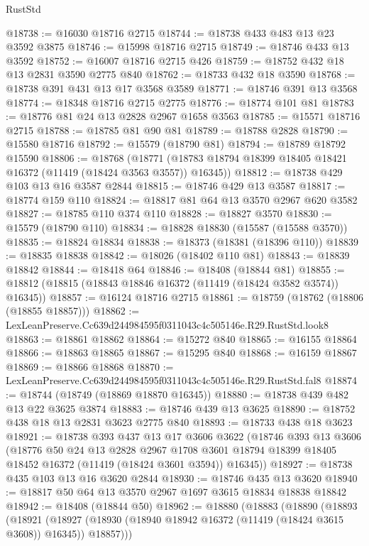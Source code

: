 \begin{lexlean}{RustStd}
\begin{coremodule}
@18738 := @16030 @18716 @2715
@18744 := @18738 @433 @483 @13 @23 @3592 @3875
@18746 := @15998 @18716 @2715
@18749 := @18746 @433 @13 @3592
@18752 := @16007 @18716 @2715 @426
@18759 := @18752 @432 @18 @13 @2831 @3590 @2775 @840
@18762 := @18733 @432 @18 @3590
@18768 := @18738 @391 @431 @13 @17 @3568 @3589
@18771 := @18746 @391 @13 @3568
@18774 := @18348 @18716 @2715 @2775
@18776 := @18774 @101 @81
@18783 := @18776 @81 @24 @13 @2828 @2967 @1658 @3563
@18785 := @15571 @18716 @2715
@18788 := @18785 @81 @90 @81
@18789 := @18788 @2828
@18790 := @15580 @18716
@18792 := @15579 (@18790 @81)
@18794 := @18789 @18792 @15590
@18806 := @18768
    (@18771 (@18783 @18794 @18399 @18405 @18421 @16372 (@11419 (@18424 @3563 @3557)) @16345))
@18812 := @18738 @429 @103 @13 @16 @3587 @2844
@18815 := @18746 @429 @13 @3587
@18817 := @18774 @159 @110
@18824 := @18817 @81 @64 @13 @3570 @2967 @620 @3582
@18827 := @18785 @110 @374 @110
@18828 := @18827 @3570
@18830 := @15579 (@18790 @110)
@18834 := @18828 @18830 (@15587 (@15588 @3570))
@18835 := @18824 @18834
@18838 := @18373 (@18381 (@18396 @110))
@18839 := @18835 @18838
@18842 := @18026 (@18402 @110 @81)
@18843 := @18839 @18842
@18844 := @18418 @64
@18846 := @18408 (@18844 @81)
@18855 := @18812 (@18815 (@18843 @18846 @16372 (@11419 (@18424 @3582 @3574)) @16345))
@18857 := @16124 @18716 @2715
@18861 := @18759 (@18762 (@18806 (@18855 @18857)))
@18862 := LexLeanPreserve.Cc639d244984595f0311043c4c505146e.R29.RustStd.look8
@18863 := @18861 @18862
@18864 := @15272 @840
@18865 := @16155 @18864
@18866 := @18863 @18865
@18867 := @15295 @840
@18868 := @16159 @18867
@18869 := @18866 @18868
@18870 := LexLeanPreserve.Cc639d244984595f0311043c4c505146e.R29.RustStd.fal8
@18874 := @18744 (@18749 (@18869 @18870 @16345))
@18880 := @18738 @439 @482 @13 @22 @3625 @3874
@18883 := @18746 @439 @13 @3625
@18890 := @18752 @438 @18 @13 @2831 @3623 @2775 @840
@18893 := @18733 @438 @18 @3623
@18921 := @18738
    @393
    @437
    @13
    @17
    @3606
    @3622
    (@18746
      @393
      @13
      @3606
      (@18776
        @50
        @24
        @13
        @2828
        @2967
        @1708
        @3601
        @18794
        @18399
        @18405
        @18452
        @16372
        (@11419 (@18424 @3601 @3594))
        @16345))
@18927 := @18738 @435 @103 @13 @16 @3620 @2844
@18930 := @18746 @435 @13 @3620
@18940 := @18817 @50 @64 @13 @3570 @2967 @1697 @3615 @18834 @18838 @18842
@18942 := @18408 (@18844 @50)
@18962 := @18880
    (@18883
      (@18890
        (@18893
          (@18921
            (@18927 (@18930 (@18940 @18942 @16372 (@11419 (@18424 @3615 @3608)) @16345)) @18857)))

\end{coremodule}
\end{lexlean}
